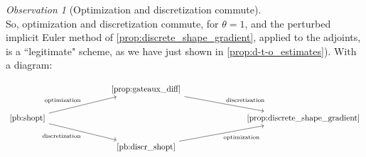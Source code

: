 \documentclass[english,a4paper,10pt,oneside]{scrbook}	%
\theoremstyle{break}
\theoremstyle{remark}
\newtheorem{obs}[equation]{Observation}
\begin{document}
\begin{obs}[Optimization and discretization commute]
\mbox{}\\
So, optimization and discretization commute, for $\theta=1$, and the perturbed implicit Euler method of \cref{prop:discrete_shape_gradient}, applied to the adjoints, is a ``legitimate" scheme, as we have just shown in \cref{prop:d-t-o_estimates}).
With a diagram:

\[\begin{tikzcd}
	&&& \text{\cref{prop:gateaux_diff}} \\
	\text{\cref{pb:shopt}} &&&&&& \text{\cref{prop:discrete_shape_gradient}}  \\
	&&& \text{\cref{pb:discr_shopt}} 
	\arrow["{\text{optimization}}"', from=3-4, to=2-7]
	\arrow["{\text{discretization}}", from=1-4, to=2-7]
	\arrow["{\text{optimization}}", from=2-1, to=1-4]
	\arrow["{\text{discretization}}"', from=2-1, to=3-4]
\end{tikzcd}\]


\end{obs}



\end{document}
